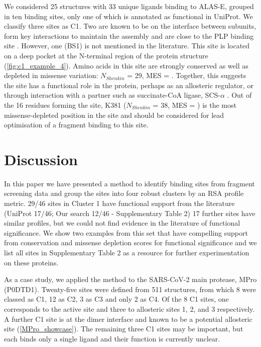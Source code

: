 We considered 25 structures with 33 unique ligands binding to ALAS-E, grouped in ten binding sites, only one of which is annotated as functional in UniProt. We classify three sites as C1. Two are known to be on the interface between subunits, form key interactions to maintain the assembly and are close to the PLP binding site \cite{BAILEY_2020_AMINOLEVULINATE}. However, one (BS1) is not mentioned in the literature. This site is located on a deep pocket at the N-terminal region of the protein structure (\autoref{fig:c1_example_4}). Amino acids in this site are strongly conserved as well as depleted in missense variation: $N_{Shenkin}$ = 29, MES = . Together, this suggests the site has a functional role in the protein, perhaps as an allosteric regulator, or through interaction with a partner such as succinate-CoA ligase, SCS-$\alpha$ \cite{FURUYAMA_2000_SIDEROBLASTIC}. Out of the 16 residues forming the site, K381 ($N_{Shenkin}$ = 38, MES = ) is the most missense-depleted position in the site and should be considered for lead optimisation of a fragment binding to this site.

\section{Discussion}

In this paper we have presented a method to identify binding sites from fragment screening data and group the sites into four robust clusters by an RSA profile metric. 29/46 sites in Cluster 1 have functional support from the literature (UniProt 17/46; Our search 12/46 - Supplementary Table 2) 17 further sites have similar profiles, but we could not find evidence in the literature of functional significance. We show two examples from this set that have compelling support from conservation and missense depletion scores for functional significance and we list all sites in Supplementary Table 2 as a resource for further experimentation on these proteins.

As a case study, we applied the method to the SARS-CoV-2 main protease, MPro (P0DTD1). Twenty-five sites were defined from 511 structures, from which 8 were classed as C1, 12 as C2, 3 as C3 and only 2 as C4. Of the 8 C1 sites, one corresponds to the active site and three to allosteric sites 1, 2, and 3 \cite{DASGUPTA_2022_ALLOSTERIC} respectively. A further C1 site  is at the dimer interface and known to be a potential allosteric site \cite{DOUANGAMATH_2020_SARSCOV2} (\autoref{MPro_showcase}). The remaining three C1 sites may be important, but each binds only a single ligand and their function is currently unclear.

